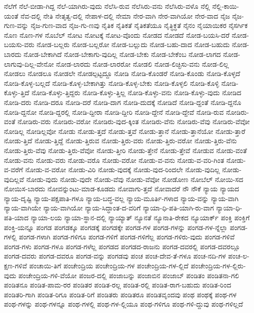 {ನೆಲೆಗೆ
ನೆಲೆ-ಬೀಡಾ-ಗಿದ್ದ
ನೆಲೆ-ಯಾಗಿರು-ವುದು
ನೆಲೆಸಿ-ರುವ
ನೆಲೆಸಿರು-ವನು
ನೆಲೆಸಿರು-ವಳೊ
ನೆಲ್ಲಿ
ನೆಲ್ಲಿ-ಕಾಯಿ-ಯಂತೆ
ನೆವ-ದಲ್ಲಿ
ನೇತಿ
ನೇತೃತ್ವ-ದಲ್ಲಿ
ನೇಪಾಳ-ದಲ್ಲಿ
ನೇಮಾ
ನೇರ-ವಾಗಿ
ನೇರ-ವಾಗಿಯೋ
ನೇರ-ವಾದ
ನೈಜ
ನೈಜ-ಗುಣ-ವನ್ನು
ನೈಜ-ಗುಣ-ವಾದ
ನೈಜ-ಗು-ಣವು
ನೈತಿಕ
ನೈತಿಕತೆ
ನೈತಿಕತೆಯೂ
ನೈತ್ಧಿಕ್ಧತೆ
ನೈನಂ
ನೈಯಾಯಿಕರ
ನೈಸರ್ಗಿಕ
ನೊಣ
ನೊಣ-ಗಳ
ನೊಬೆಲ್
ನೋಟ
ನೋಟಕ್ಕೆ
ನೋಟ-ವೊಂದು
ನೋಡದ
ನೋಡದೆ
ನೋಡ-ಬಯಸಿ-ದರೆ
ನೋಡ-ಬಯಸು-ವರು
ನೋಡ-ಬಲ್ಲರು
ನೋಡ-ಬಲ್ಲರೋ
ನೋಡ-ಬಲ್ಲುದು
ನೋಡ-ಬಹು-ದಾದ
ನೋಡ-ಬಹುದು
ನೋಡ-ಬಾರದು
ನೋಡ-ಬೇಕಾಗಿದೆ
ನೋಡ-ಬೇಕಾಗು-ವುದಿಲ್ಲ
ನೋಡ-ಬೇಕು
ನೋಡ-ಬೇಕೆಂಬ
ನೋಡ-ಲಾಗದ
ನೋಡ-ಲಾಗುವು-ದಿಲ್ಲ-ವೇನೋ
ನೋಡ-ಲಾರದು
ನೋಡ-ಲಾರರೋ
ನೋಡಲಿ
ನೋಡ-ಲಿಚ್ಛಿಸು-ವನು
ನೋಡ-ಲಿಲ್ಲ
ನೋಡಲು
ನೋಡಲೂ
ನೋಡಲೇ
ನೋಡಲ್ಪಟ್ಟದ್ದೂ
ನೋಡಿ
ನೋಡಿ-ಕೊಂಡರೆ
ನೋಡಿ-ಕೊಂಡು
ನೋಡಿ-ಕೊಳ್ಳದೆ
ನೋಡಿ-ಕೊಳ್ಳ-ಬಲ್ಲದೆ
ನೋಡಿ-ಕೊಳ್ಳ-ಬೇಕಾಗಿತ್ತು
ನೋಡಿ-ಕೊಳ್ಳ-ಬೇಕು
ನೋಡಿ-ಕೊಳ್ಳಲಿ
ನೋಡಿ-ಕೊಳ್ಳಿ
ನೋಡಿ-ಕೊಳ್ಳು-ತ್ತಿದೆ
ನೋಡಿ-ಕೊಳ್ಳು-ತ್ತಿದ್ದರು
ನೋಡಿ-ಕೊಳ್ಳು-ತ್ತಿಲ್ಲ
ನೋಡಿ-ಕೊಳ್ಳು-ವನು
ನೋಡಿ-ಕೊಳ್ಳು-ವುದು
ನೋಡಿದ
ನೋಡಿ-ದರು
ನೋಡಿ-ದರೂ
ನೋಡಿ-ದರೆ
ನೋಡಿ-ದಾಗ
ನೋಡಿ-ದುದಕ್ಕೆ
ನೋಡಿದೆ
ನೋಡಿ-ದ್ದಂತೆ
ನೋಡಿ-ದ್ದನೊ
ನೋಡಿ-ದ್ದನೋ
ನೋಡಿ-ದ್ದರಲ್ಲಿ
ನೋಡಿ-ದ್ದೀರಾ
ನೋಡಿ-ದ್ದೀರಿ
ನೋಡಿ-ದ್ದೇನೆ
ನೋಡಿ-ದ್ದೇವೆ
ನೋಡಿ-ರುವ
ನೋಡಿರು-ವಂತೆ
ನೋಡಿರು-ವರು
ನೋಡಿರು-ವರೋ
ನೋಡಿರು-ವುದ-ಕ್ಕಿಂತ
ನೋಡಿರು-ವೆನು
ನೋಡಿರು-ವೆವು
ನೋಡಿರು-ವೆವೋ
ನೋಡಿಲ್ಲ
ನೋಡಿಲ್ಲವೋ
ನೋಡು
ನೋಡು-ತ್ತದೆ
ನೋಡು-ತ್ತವೆ
ನೋಡು-ತ್ತಾನೆ
ನೋಡು-ತ್ತಾನೆಯೋ
ನೋಡು-ತ್ತಾರೆ
ನೋಡು-ತ್ತಿದೆ
ನೋಡು-ತ್ತಿದ್ದೆ
ನೋಡು-ತ್ತಿರುವ
ನೋಡು-ತ್ತಿರು-ವರು
ನೋಡು-ತ್ತಿರು-ವರೋ
ನೋಡು-ತ್ತಿರು-ವೆನು
ನೋಡು-ತ್ತಿರು-ವೆವು
ನೋಡು-ತ್ತಿರು-ವೆವೋ
ನೋಡು-ತ್ತೀರಿ
ನೋಡು-ತ್ತೇನೆ
ನೋಡು-ತ್ತೇವೆ
ನೋಡುವ
ನೋಡು-ವಂತೆ
ನೋಡು-ವನು
ನೋಡು-ವರು
ನೋಡು-ವರೊ
ನೋಡು-ವರೋ
ನೋಡು-ವ-ವನು
ನೋಡು-ವ-ವರಿ-ಗಿಂತ
ನೋಡು-ವ-ವರೆಗೆ
ನೋಡು-ವ-ವರೋ
ನೋಡು-ವಿರಿ
ನೋಡು-ವುದಕ್ಕೆ
ನೋಡು-ವುದ-ರಿಂದಲೇ
ನೋಡು-ವುದಿಲ್ಲ
ನೋಡು-ವುದಿಲ್ಲವೆ
ನೋಡು-ವುದು
ನೋಡು-ವುದೇ
ನೋಡು-ವೆವು
ನೋಡು-ವೆವೋ
ನೋಡೋಣ
ನೋಬೆಲ್
ನೋಯಿ-ಸದ
ನೋಯಿಸ-ಬಾರದು
ನೋವನ್ನುಂಟು-ಮಾಡ-ಕೂಡದು
ನೋವಾಗು-ತ್ತದೆ
ನೋವಾದರೆ
ನೌ
ನೌಕೆ
ನ್ಯಾಯ
ನ್ಯಾಯದ
ನ್ಯಾಯ-ದೃಷ್ಟಿ
ನ್ಯಾಯ-ಪಕ್ಷಪಾತಿ-ಗಳೂ
ನ್ಯಾಯ-ಬದ್ಧ-ವಲ್ಲ
ನ್ಯಾಯ-ಮೂರ್ತಿ-ಗಳಾದ
ನ್ಯಾಯ-ವನ್ನು
ನ್ಯಾಯ-ವಾಗಿ
ನ್ಯಾಯ-ವಾಗಿಯೇ
ನ್ಯಾಯ-ವಾಗಿಯೋ
ನ್ಯಾಯ-ಸಿದ್ಧಾಂತ-ದ-ವರಿಗೆ
ನ್ಯಾಯಾ-ಧಿ-ಪತಿ-ಯಾಗಿ-ರು-ವಾಗ
ನ್ಯಾಯಾ-ಧಿ-ಪತಿ-ಯಾದ
ನ್ಯಾಯಾ-ಲಯ
ನ್ಯಾಯಾ-ಸ್ಥಾನ-ದಲ್ಲಿ
ನ್ಯಾಯ್ಯಾತ್
ನ್ಯೂನತೆ
ನ್ಯೂನಾತಿ-ರೇಕದ
ನ್ಯೂಯಾರ್ಕ್
ಪಂಕ್ತಿ
ಪಂಕ್ತಿಗೆ
ಪಂಕ್ತಿ-ಯನ್ನೂ
ಪಂಗಡ
ಪಂಗಡಕ್ಕೂ
ಪಂಗಡಕ್ಕೆ
ಪಂಗಡಕ್ಕೇ
ಪಂಗಡ-ಗಳ
ಪಂಗಡ-ಗಳನ್ನು
ಪಂಗಡ-ಗಳ-ನ್ನೆಲ್ಲಾ
ಪಂಗಡ-ಗಳಲ್ಲಿ
ಪಂಗಡ-ಗಳಾಗಿ
ಪಂಗಡ-ಗಳಿಗೂ
ಪಂಗಡ-ಗಳಿಗೆ
ಪಂಗಡ-ಗಳಿಗೆಲ್ಲ
ಪಂಗಡ-ಗಳಿರು-ವುದು
ಪಂಗಡ-ಗಳಿವೆ
ಪಂಗಡ-ಗಳು
ಪಂಗಡ-ಗಳೂ
ಪಂಗಡ-ಗಳೆಲ್ಲ
ಪಂಗಡದ
ಪಂಗಡದ-ರಾಜನು
ಪಂಗಡ-ದವರಲ್ಲಿ
ಪಂಗಡ-ದವರಲ್ಲೂ
ಪಂಗಡ-ದವರು
ಪಂಗಡ-ದವರೂ
ಪಂಗಡ-ವನ್ನು
ಪಂಗಡವು
ಪಂಚ
ಪಂಚ-ದೇವ-ತೆ-ಗಳೂ
ಪಂಚ-ನದಿ-ಗಳ
ಪಂಚ-ಲ-ಕ್ಷಣ-ಗಳಿವೆ
ಪಂಚಾಯಿ-ತಿಗೆ
ಪಂಚೇಂದ್ರಿಯ
ಪಂಚೇಂದ್ರಿಯ-ಗಳ
ಪಂಚೇಂದ್ರಿಯ-ಗಳ-ಲ್ಲಿದೆ
ಪಂಚೇಂದ್ರಿಯ-ಗಳ-ಲ್ಲಿರು-ವುದು
ಪಂಚೇಂದ್ರಿಯ-ಗಳಿ-ವೆಯೋ
ಪಂಜರ-ದಲ್ಲಿ
ಪಂಜಾಬನ್ನು
ಪಂಜಾಬಿನ
ಪಂಜಾಬ್
ಪಂಡಿತಂ
ಪಂಡಿತನಾ-ಗಲಿ
ಪಂಡಿತನೂ
ಪಂಡಿತ-ಪಾಮ-ರರ
ಪಂಡಿತರ
ಪಂಡಿತ-ರಲ್ಲ
ಪಂಡಿತ-ರಲ್ಲಿ
ಪಂಡಿತ-ರಾಗ-ಬಹುದು
ಪಂಡಿತ-ರಿಂದ
ಪಂಡಿತರಿ-ಗಾಗಿ
ಪಂಡಿತ-ರಿಗೂ
ಪಂಡಿತ-ರಿಗೆ
ಪಂಡಿತರು
ಪಂಡಿತರೂ
ಪಂಡಿತವೃಂದವು
ಪಂಥ
ಪಂಥಕ್ಕೆ
ಪಂಥ-ಗಳ
ಪಂಥ-ಗಳನ್ನು
ಪಂಥ-ಗಳನ್ನೂ
ಪಂಥ-ಗಳಲ್ಲಿ
ಪಂಥ-ಗಳ-ಲ್ಲಿಯೂ
ಪಂಥ-ಗಳಿಗೂ
ಪಂಥ-ಗಳಿ-ದ್ದುವು
ಪಂಥ-ಗಳಿಲ್ಲದೆ
}
